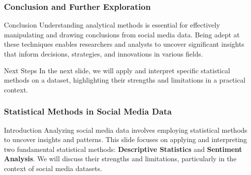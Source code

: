 \documentclass{beamer}
\begin{document}
\begin{frame}[fragile]
    \frametitle{Conclusion and Further Exploration}
    \begin{block}{Conclusion}
        Understanding analytical methods is essential for effectively manipulating and drawing conclusions from social media data. Being adept at these techniques enables researchers and analysts to uncover significant insights that inform decisions, strategies, and innovations in various fields.
    \end{block}
    
    \begin{block}{Next Steps}
        In the next slide, we will apply and interpret specific statistical methods on a dataset, highlighting their strengths and limitations in a practical context.
    \end{block}
\end{frame}

\begin{frame}[fragile]
    \frametitle{Statistical Methods in Social Media Data}
    \begin{block}{Introduction}
        Analyzing social media data involves employing statistical methods to uncover insights and patterns. This slide focuses on applying and interpreting two fundamental statistical methods: 
        \textbf{Descriptive Statistics} and \textbf{Sentiment Analysis}. We will discuss their strengths and limitations, particularly in the context of social media datasets.
    \end{block}
\end{frame}
\end{document}
